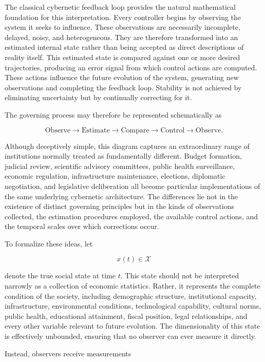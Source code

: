\documentclass[12pt,a4paper]{article}
\begin{document}
The classical cybernetic feedback loop provides the natural mathematical foundation for this interpretation. Every controller begins by observing the system it seeks to influence. These observations are necessarily incomplete, delayed, noisy, and heterogeneous. They are therefore transformed into an estimated internal state rather than being accepted as direct descriptions of reality itself. This estimated state is compared against one or more desired trajectories, producing an error signal from which control actions are computed. These actions influence the future evolution of the system, generating new observations and completing the feedback loop. Stability is not achieved by eliminating uncertainty but by continually correcting for it.

The governing process may therefore be represented schematically as

\[
\text{Observe}
\rightarrow
\text{Estimate}
\rightarrow
\text{Compare}
\rightarrow
\text{Control}
\rightarrow
\text{Observe}.
\]

Although deceptively simple, this diagram captures an extraordinary range of institutions normally treated as fundamentally different. Budget formation, judicial review, scientific advisory committees, public health surveillance, economic regulation, infrastructure maintenance, elections, diplomatic negotiation, and legislative deliberation all become particular implementations of the same underlying cybernetic architecture. The differences lie not in the existence of distinct governing principles but in the kinds of observations collected, the estimation procedures employed, the available control actions, and the temporal scales over which corrections occur.

To formalize these ideas, let

\[
x(t)\in\mathcal{X}
\]

denote the true social state at time \(t\). This state should not be interpreted narrowly as a collection of economic statistics. Rather, it represents the complete condition of the society, including demographic structure, institutional capacity, infrastructure, environmental conditions, technological capability, cultural norms, public health, educational attainment, fiscal position, legal relationships, and every other variable relevant to future evolution. The dimensionality of this state is effectively unbounded, ensuring that no observer can ever measure it directly.

Instead, observers receive measurements
\end{document}
